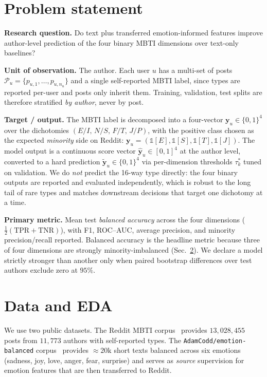 \documentclass{article}
\begin{document}
\section{Problem statement}

\textbf{Research question.} Do text plus transferred emotion-informed features improve author-level prediction of the four binary MBTI dimensions over text-only baselines?

\textbf{Unit of observation.} The author. Each user $u$ has a multi-set of posts $\mathcal{P}_u = \{p_{u,1}, \ldots, p_{u,n_u}\}$ and a single self-reported MBTI label, since types are reported per-user and posts only inherit them. Training, validation, test splits are therefore stratified \emph{by author}, never by post.

\textbf{Target / output.} The MBTI label is decomposed into a four-vector $\mathbf{y}_u \in \{0,1\}^{4}$ over the dichotomies $(E/I,\,N/S,\,F/T,\,J/P)$, with the positive class chosen as the expected \emph{minority} side on Reddit: $\mathbf{y}_u = (\mathbb{1}[E],\mathbb{1}[S],\mathbb{1}[T],\mathbb{1}[J])$. The model output is a continuous score vector $\hat{\mathbf{y}}_u \in [0,1]^{4}$ at the author level, converted to a hard prediction $\tilde{\mathbf{y}}_u \in \{0,1\}^{4}$ via per-dimension thresholds $\tau_k^{*}$ tuned on validation. We do \emph{not} predict the 16-way type directly: the four binary outputs are reported and evaluated independently, which is robust to the long tail of rare types and matches downstream decisions that target one dichotomy at a time.

\textbf{Primary metric.} Mean test \emph{balanced accuracy} across the four dimensions ($\tfrac12(\mathrm{TPR}+\mathrm{TNR})$), with F1, ROC--AUC, average precision, and minority precision/recall reported. Balanced accuracy is the headline metric because three of four dimensions are strongly minority-imbalanced (Sec.~\ref{sec:data}). We declare a model strictly stronger than another only when paired bootstrap differences over test authors exclude zero at $95\%$.

\section{Data and EDA}\label{sec:data}

We use two public datasets. The Reddit MBTI corpus~\citep{kaggle_reddit_mbti} provides $13{,}028{,}455$ posts from $11{,}773$ authors with self-reported types. The \texttt{AdamCodd/emotion-balanced} corpus~\citep{hf_emotion_balanced} provides $\approx{20}\text{k}$ short texts balanced across six emotions (sadness, joy, love, anger, fear, surprise) and serves as \emph{source} supervision for emotion features that are then transferred to Reddit.
\end{document}
